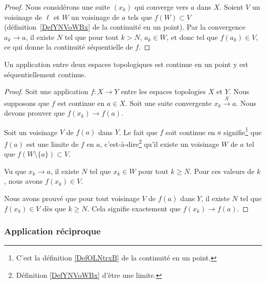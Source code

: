 \begin{proof}
  Nous considérons une suite \( (x_k)\) qui converge vers \( a\) dans \( X\). Soient \( V\) un voisinage de \( \ell \) et \( W\) un voisinage de \( a\) tels que \( f(W)\subset V\) (définition~\ref{DefYNVoWBx} de la continuité en un point). Par la convergence \( a_k\to a\),  il existe \( N\) tel que pour tout \( k>N\), \( a_k\in W\), et donc tel que \( f(a_k)\in V\), ce qui donne la continuité séquentielle de \( f\).
\end{proof}

\begin{corollary}		\label{PropFnContParSuite}
    Un application entre deux espaces topologiques est continue en un point y est séquentiellement continue.
\end{corollary}

\begin{proof}
    Soit une application \( f\colon X\to Y\) entre les espaces topologies \( X\) et \( Y\). Nous supposons que \( f\) est continue en \( a\in X\). Soit une suite convergente \( x_k\stackrel{X}{\longrightarrow}a\). Nous devons prouver que \( f(x_k)\to f(a)\).

    Soit un voisinage \( V\) de \( f(a)\) dans \( Y\). Le fait que \( f\) soit continue en \( a\) signifie\footnote{C'est la définition \ref{DefOLNtrxB} de la continuité en un point.} que \( f(a)\) est une limite de \( f\) en \( a\), c'est-à-dire\footnote{Définition \ref{DefYNVoWBx} d'être une limite.} qu'il existe un voisinage \( W\) de \( a\) tel que \( f(W\setminus\{ a \})\subset V\).

    Vu que \( x_k\to a\), il existe \( N\) tel que \( x_k\in W\) pour tout \( k\geq N\). Pour ces valeurs de \( k\), nous avons \( f(x_k)\in V\).

    Nous avons prouvé que pour tout voisinage \( V\) de \( f(a)\) dans \( Y\), il existe \( N\) tel que \( f(x_k)\in V\) dès que \( k\geq N\). Cela signifie exactement que \( f(x_k)\to f(a)\).
\end{proof}


\subsubsection{Application réciproque}

